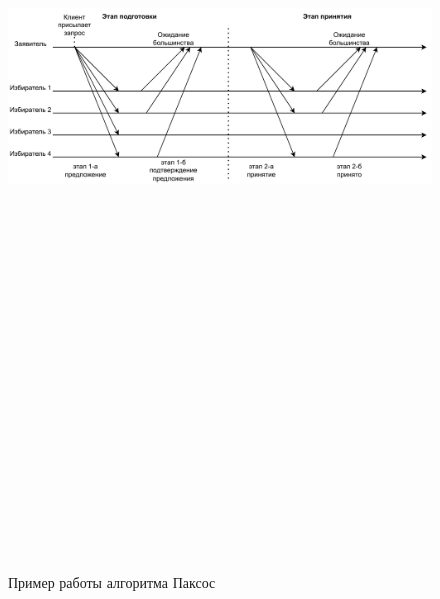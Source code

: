                 \begin{figure}
                    \centering
                    \includegraphics[width=\textwidth,height=25cm,keepaspectratio]{inc/img/paxos.pdf}
                    \caption{Пример работы алгоритма Паксос} \label{fig:paxos}
                \end{figure}
                
